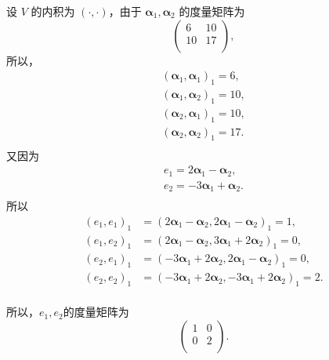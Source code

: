 \begin{enumerate}[1~]
\begin{enumerate}[1.~]
\begin{solution}
设 $V$ 的内积为 $(\cdot, \cdot)$，由于 $\boldsymbol{\alpha}_1, \boldsymbol{\alpha}_2$ 的度量矩阵为
$$\left( \begin{matrix}
	6&		10\\
	10&		17\\
\end{matrix} \right),$$
所以，
$$
\begin{array}{l}
	\left( \boldsymbol{\alpha} _1,\boldsymbol{\alpha} _1 \right) _1=6,\\
	\left( \boldsymbol{\alpha} _1,\boldsymbol{\alpha} _2 \right) _1=10,\\
	\left( \boldsymbol{\alpha} _2,\boldsymbol{\alpha} _1 \right) _1=10,\\
	\left( \boldsymbol{\alpha} _2,\boldsymbol{\alpha} _2 \right) _1=17.\\
\end{array}
$$
又因为
$$
\begin{array}{l}
	e_1 = 2 \boldsymbol{\alpha} _1 - \boldsymbol{\alpha} _2,\\
	e_2 = -3 \boldsymbol{\alpha} _1 + \boldsymbol{\alpha} _2 .\\
\end{array}
$$
所以
\begin{align*}
(e_1, e_1)_1 &= (2 \boldsymbol{\alpha}_1- \boldsymbol{\alpha}_2, 2 \boldsymbol{\alpha}_1- \boldsymbol{\alpha}_2)_1 = 1,\\
(e_1, e_2)_1 &= (2 \boldsymbol{\alpha}_1- \boldsymbol{\alpha}_2, 3\boldsymbol{\alpha}_1 +2\boldsymbol{\alpha}_2)_1 = 0,\\
(e_2, e_1)_1 &= (-3 \boldsymbol{\alpha}_1+ 2\boldsymbol{\alpha}_2, 2 \boldsymbol{\alpha}_1- \boldsymbol{\alpha}_2)_1 = 0,\\
(e_2, e_2)_1 &= (-3 \boldsymbol{\alpha}_1+ 2\boldsymbol{\alpha}_2, -3 \boldsymbol{\alpha}_1+2 \boldsymbol{\alpha}_2)_1 = 2.\\
\end{align*}

所以，$e_1, e_2$的度量矩阵为$$
\left( \begin{matrix}
	1&		0\\
	0&		2\\
\end{matrix} \right).
$$
\end{solution}
\end{enumerate}


\end{enumerate}
